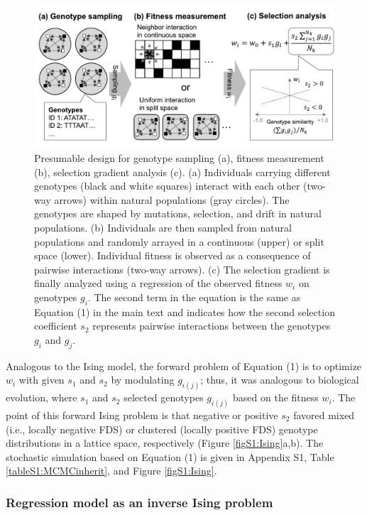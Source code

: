 \documentclass[12pt,]{article}
\begin{document}
\begin{figure}[ht]
  \includegraphics[width=\linewidth]{scheme.pdf}
  \caption{Presumable design for genotype sampling (a), fitness measurement (b), selection gradient analysis (c). (a) Individuals carrying different genotypes (black and white squares) interact with each other (two-way arrows) within natural populations (gray circles). The genotypes are shaped by mutations, selection, and drift in natural populations. (b) Individuals are then sampled from natural populations and randomly arrayed in a continuous (upper) or split space (lower). Individual fitness is observed as a consequence of pairwise interactions (two-way arrows). (c) The selection gradient is finally analyzed using a regression of the observed fitness $w_i$ on genotypes $g_i$. The second term in the equation is the same as Equation (1) in the main text and indicates how the second selection coefficient $s_2$ represents pairwise interactions between the genotypes $g_i$ and $g_j$.
}
  \label{fig1:scheme}
\end{figure}

Analogous to the Ising model, the forward problem of Equation (1) is to optimize $w_i$ with given $s_1$ and $s_2$ by modulating $g_{i(j)}$; thus, it was analogous to biological evolution, where $s_1$ and $s_2$ selected genotypes $g_{i(j)}$ based on the fitness $w_i$. The point of this forward Ising problem is that negative or positive $s_2$ favored mixed (i.e., locally negative FDS) or clustered (locally positive FDS) genotype distributions in a lattice space, respectively (Figure \ref{figS1:Ising}a,b). The stochastic simulation based on Equation (1) is given in Appendix S1, Table \ref{tableS1:MCMCinherit}, and Figure \ref{figS1:Ising}.


\subsubsection{Regression model as an inverse Ising problem}
\end{document}
